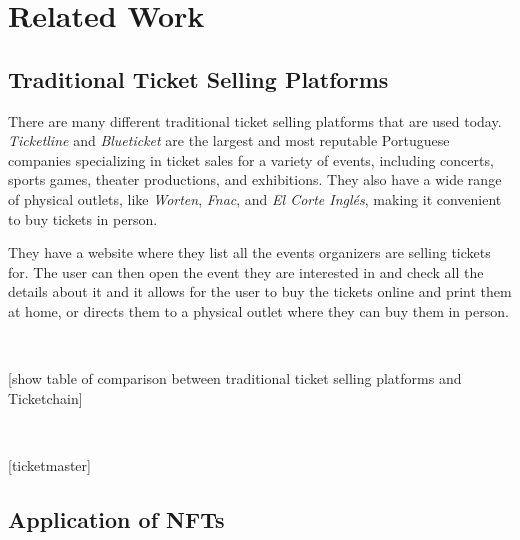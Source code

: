 \section{Related Work}

\subsection{Traditional Ticket Selling Platforms}

There are many different traditional ticket selling platforms that are used today. \emph{Ticketline} and \emph{Blueticket} are the largest and most reputable Portuguese companies specializing in ticket sales for a variety of events, including concerts, sports games, theater productions, and exhibitions. They also have a wide range of physical outlets, like \emph{Worten}, \emph{Fnac}, and \emph{El Corte Inglés}, making it convenient to buy tickets in person.

They have a website where they list all the events organizers are selling tickets for. The user can then open the event they are interested in and check all the details about it and it allows for the user to buy the tickets online and print them at home, or directs them to a physical outlet where they can buy them in person.

~

[show table of comparison between traditional ticket selling platforms and Ticketchain]

~

[ticketmaster]

\subsection{Application of NFTs}
